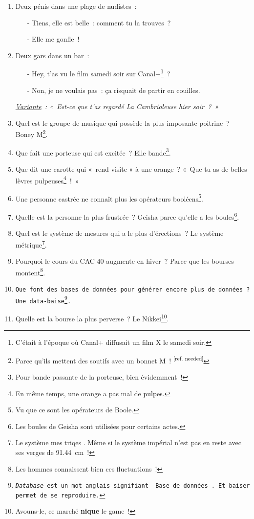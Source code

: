 \documentclass[10pt,a5paper,fullpage]{book}
\begin{document}
\begin{enumerate}
	\item Deux pénis dans une plage de nudistes~: 
	\begin{itemize}
		\item[-] Tiens, elle est belle~: comment tu la trouves~?
		\item[-] Elle me gonfle~!~
	\end{itemize}
	\item Deux gars dans un bar~:
	\begin{itemize}
		\item[-] Hey, t’as vu le film samedi soir sur Canal+\footnote{C'était à l'époque où Canal+ diffusait un film X le samedi soir.}~?
		\item[-] Non, je ne voulais pas~: ça risquait de partir en couilles. 
	\end{itemize}
	\textit{\underline{Variante}~: «~Est-ce que t’as regardé La Cambrioleuse hier soir~?~»}
	\item Quel est le groupe de musique qui possède la plus imposante poitrine~? Boney M\footnote{Parce qu'ils mettent des soutifs avec un bonnet M~! \textsuperscript{[ref. needed]} }.
	\item Que fait une porteuse qui est excitée~? Elle bande\footnote{Pour bande passante de la porteuse, bien évidemment~!}.
	\item Que dit une carotte qui « rend visite » à une orange~? « Que tu as de belles lèvres pulpeuses\footnote{En même temps, une orange a pas mal de pulpes.}~! »
	\item Une personne castrée ne connaît plus les opérateurs booléens\footnote{Vu que ce sont les opérateurs de Boole.}.
	\item Quelle est la personne la plus frustrée~? Geisha parce qu’elle a les boules\footnote{Les boules de Geisha sont utilisées pour certains actes.}.
	\item Quel est le système de mesures qui a le plus d’érections~? Le système métrique\footnote{Le système \guillemotleft mes triqes \guillemotright. Même si le système impérial n'est pas en reste avec ses verges de 91.44~cm~!}.
	\item Pourquoi le cours du CAC 40 augmente en hiver~? Parce que les bourses montent\footnote{Les hommes connaissent bien ces fluctuations~!}. 
	\item \texttt{Que font des bases de données pour générer encore plus de données~? Une data-baise\footnote{\textit{Database} est un mot anglais signifiant \guillemotleft~Base de données~\guillemotright. Et baiser permet de se reproduire. }.}
	\item Quelle est la bourse la plus perverse~? Le Nikkei\footnote{Avouns-le, ce marché \textbf{nique} le game~!}.

\end{enumerate}
\end{document}
